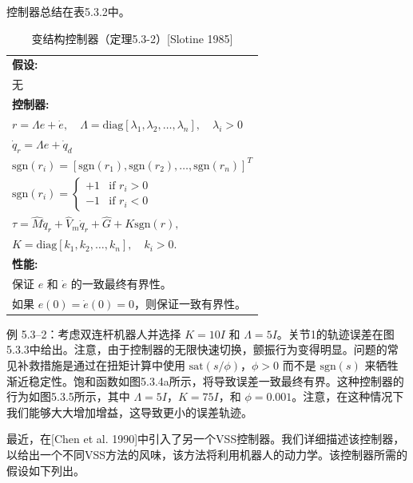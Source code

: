 \documentclass[UTF8,12pt,a4paper]{ctexart}
\begin{document}
控制器总结在表5.3.2中。

\begin{table}[htbp]
\centering
\caption{变结构控制器（定理5.3-2）[Slotine 1985]}
\label{tab:5.3.2}
\begin{tabular}{@{}l@{}}
\toprule
\textbf{假设:} \\
\quad 无 \\[1em]
\textbf{控制器:} \\[0.5em]
\quad $\displaystyle r = \Lambda e + \dot{e}, \quad \Lambda = \text{diag}[\lambda_1, \lambda_2, \ldots, \lambda_n], \quad \lambda_i > 0$ \\[0.5em]
\quad $\displaystyle \dot{q}_r = \Lambda e + \dot{q}_d$ \\[0.5em]
\quad $\displaystyle \text{sgn}(r_i) = [\text{sgn}(r_1), \text{sgn}(r_2), \ldots, \text{sgn}(r_n)]^T$ \\[0.5em]
\quad $\displaystyle \text{sgn}(r_i) = \begin{cases} +1 & \text{if } r_i > 0 \\ -1 & \text{if } r_i < 0 \end{cases}$ \\[0.8em]
\quad $\displaystyle \tau = \hat{M}\ddot{q}_r + \hat{V}_m\dot{q}_r + \hat{G} + K\text{sgn}(r),$ \\[0.5em]
\quad $\displaystyle K = \text{diag}[k_1, k_2, \ldots, k_n], \quad k_i > 0.$ \\[1em]
\midrule
\textbf{性能:} \\
\quad 保证 $e$ 和 $\dot{e}$ 的一致最终有界性。 \\
\quad 如果 $e(0) = \dot{e}(0) = 0$，则保证一致有界性。 \\
\bottomrule
\end{tabular}
\end{table}

\begin{example}[VSS控制器 1]
例 5.3--2：考虑双连杆机器人并选择 $K = 10I$ 和 $\Lambda = 5I$。关节1的轨迹误差在图5.3.3中给出。注意，由于控制器的无限快速切换，颤振行为变得明显。问题的常见补救措施是通过在扭矩计算中使用 $\text{sat}(s/\phi)$，$\phi > 0$ 而不是 $\text{sgn}(s)$ 来牺牲渐近稳定性。饱和函数如图5.3.4a所示，将导致误差一致最终有界。这种控制器的行为如图5.3.5所示，其中 $\Lambda = 5I$，$K = 75I$，和 $\phi = 0.001$。注意，在这种情况下我们能够大大增加增益，这导致更小的误差轨迹。
\end{example}

最近，在[Chen et al. 1990]中引入了另一个VSS控制器。我们详细描述该控制器，以给出一个不同VSS方法的风味，该方法将利用机器人的动力学。该控制器所需的假设如下列出。
\end{document}
